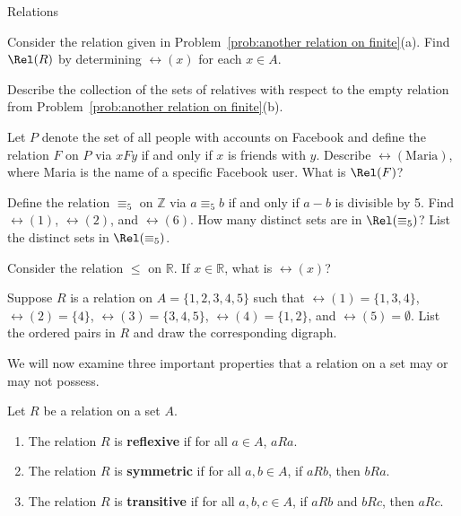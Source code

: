 \begin{section}{Relations}
\begin{problem}
Consider the relation given in Problem~\ref{prob:another relation on finite}(a).  Find $\Rel(R)$ by determining $\rel(x)$ for each $x\in A$.
\end{problem}

\begin{problem}
Describe the collection of the sets of relatives with respect to the empty relation from Problem~\ref{prob:another relation on finite}(b).
\end{problem}

\begin{problem}\label{prob:facebook}
Let $P$ denote the set of all people with accounts on Facebook and define the relation $F$ on $P$ via $xFy$ if and only if $x$ is friends with $y$. Describe $\rel(\text{Maria})$, where Maria is the name of a specific Facebook user.  What is $\Rel(F)$?
\end{problem}

\begin{problem}\label{prob:mod 5}
Define the relation $\equiv_5$ on $\mathbb{Z}$ via $a\equiv_5 b$ if and only if $a-b$ is divisible by 5. Find $\rel(1)$, $\rel(2)$, and $\rel(6)$.  How many distinct sets are in $\Rel(\equiv_5)$? List the distinct sets in $\Rel(\equiv_5)$.
\end{problem}

\begin{problem}
Consider the relation $\leq$ on $\mathbb{R}$.  If $x\in \mathbb{R}$, what is $\rel(x)$?
\end{problem}

\begin{problem}\label{prob:find sim from Rel}
Suppose $R$ is a relation on $A=\{1,2,3,4,5\}$ such that $\rel(1)=\{1,3,4\}$, $\rel(2)=\{4\}$, $\rel(3)=\{3,4,5\}$, $\rel(4)=\{1,2\}$, and $\rel(5)=\emptyset$. List the ordered pairs in $R$ and draw the corresponding digraph.
\end{problem}

We will now examine three important properties that a relation on a set may or may not possess.

\begin{definition}
Let $R$ be a relation on a set $A$.
\begin{enumerate}[label=\textrm{(\alph*)}]
\item The relation $R$ is \textbf{reflexive} if for all $a\in A$, $aR a$.
\item The relation $R$ is \textbf{symmetric} if for all $a,b\in A$, if $aR b$, then $bR a$.
\item The relation $R$ is \textbf{transitive} if for all $a,b,c\in A$, if $aR b$ and $bR c$, then $aR c$.
\end{enumerate}
\end{definition}


\end{section}
